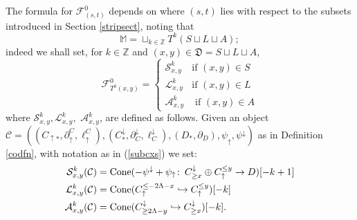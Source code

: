 \documentclass[11pt]{amsart}
\theoremstyle{definition}
\theoremstyle{remark}
\numberwithin{equation}{section}
\def\co{\colon\thinspace}
\def\Z{\mathbb{Z}}
\begin{document}
  
 The formula for  $\mathcal{F}^{0}_{(s,t)}$ depends on where $(s,t)$ lies with respect to the subsets introduced in Section \ref{stripsect}, noting that \begin{equation}\label{mdecomp} \mathbb{M}=\sqcup_{k\in \Z}T^k(S\sqcup L\sqcup A);\end{equation} indeed we shall set, for $k\in \Z$ and $(x,y)\in\mathfrak{D}=S\sqcup L\sqcup A$, \begin{equation}\label{f0dfn} \mathcal{F}_{T^k(x,y)}^{0}=\left\{\begin{array}{ll} \mathcal{S}^{k}_{x,y} & \mbox{if }(x,y)\in S \\ \mathcal{L}^{k}_{x,y} & \mbox{if }(x,y)\in L \\ \mathcal{A}^{k}_{x,y} & \mbox{ if }(x,y)\in A  \end{array}\right. \end{equation} where $\mathcal{S}^{k}_{x,y},\mathcal{L}^{k}_{x,y},$ $\mathcal{A}^{k}_{x,y}$, are defined as follows.  Given an object $\mathcal{C}=\left((C_{\uparrow *},\partial_{\uparrow}^C,\ell_{\uparrow}^C),(C^{\downarrow}_{*},\partial^{\downarrow}_C,\ell^{\downarrow}_C),(D_*,\partial_D),\psi_{\uparrow},\psi^{\downarrow}\right)$ as in Definition \ref{codfn}, with notation as in (\ref{subcxs}) we set: \begin{align*}
 	\mathcal{S}^{k}_{x,y}(\mathcal{C}) &= \mathrm{Cone}(-\psi^{\downarrow}+\psi_{\uparrow}\co C^{\downarrow}_{\geq x}\oplus C_{\uparrow}^{\leq y}\to D)[-k+1] \\
 	\mathcal{L}^{k}_{x,y}(\mathcal{C}) &= \mathrm{Cone}(C_{\uparrow}^{\leq -2\Lambda-x}\hookrightarrow C_{\uparrow}^{\leq y})[-k] \\ \mathcal{A}^{k}_{x,y}(\mathcal{C})&= \mathrm{Cone}(C^{\downarrow}_{\geq 2\Lambda-y}\hookrightarrow C^{\downarrow}_{\geq x})[-k] .
 	\end{align*}  %
\end{document}
